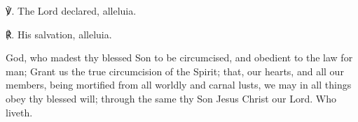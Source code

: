 ℣. The Lord declared, alleluia.

℟. His salvation, alleluia.


\collect
{} God, who madest thy blessed Son to be circumcised, and obedient to the law for man; Grant us the true circumcision of the Spirit; that, our hearts, and all our members, being mortified from all worldly and carnal lusts, we may in all things obey thy blessed will; through the same thy Son Jesus Christ our Lord. Who liveth.


\label{MostHolyName}


\firstEvensong


